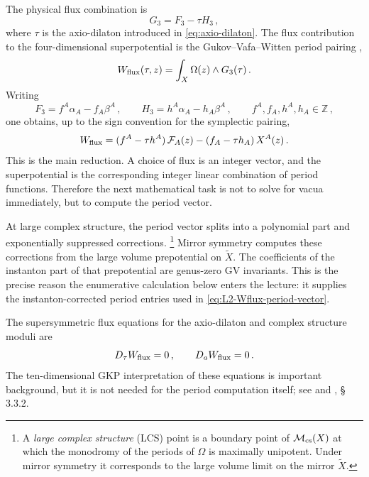 The physical flux combination is
\begin{equation}
    G_3
    =
    F_3-\tau H_3\, ,
\end{equation}
where $\tau$ is the axio-dilaton introduced in
\eqref{eq:axio-dilaton}.  The flux contribution to the
four-dimensional superpotential is the Gukov--Vafa--Witten period
pairing \cite{Gukov:1999ya},
\begin{equation}\label{eq:W-flux}
    W_{\rm flux}(\tau,z)
    =
    \int_X\Omega(z)\wedge G_3(\tau)\, .
\end{equation}
Writing
\begin{equation}
    F_3=f^A\alpha_A-f_A\beta^A\, ,
    \qquad
    H_3=h^A\alpha_A-h_A\beta^A\, ,
    \qquad
    f^A,f_A,h^A,h_A\in\mathbb Z\, ,
\end{equation}
one obtains, up to the sign convention for the symplectic pairing,
\begin{equation}\label{eq:L2-Wflux-period-vector}
    W_{\rm flux}
    =
    (f^A-\tau h^A)\,\mathcal F_A(z)
    -(f_A-\tau h_A)\,X^A(z)\, .
\end{equation}
This is the main reduction.  A choice of flux is an integer vector,
and the superpotential is the corresponding integer linear combination
of period functions.  Therefore the next mathematical task is not to
solve for vacua immediately, but to compute the period vector.

At large complex structure, the period vector splits into a polynomial
part and exponentially suppressed corrections.
\footnote{A \emph{large complex structure} (LCS) point is a boundary
point of $\mathcal M_{\rm cs}(X)$ at which the monodromy of the
periods of $\Omega$ is maximally unipotent.  Under mirror symmetry it
corresponds to the large volume limit on the mirror $\widetilde X$.}
Mirror symmetry computes these corrections from the large volume
prepotential on $\widetilde X$.  The coefficients of the instanton
part of that prepotential are genus-zero GV invariants.  This is the
precise reason the enumerative calculation below enters the lecture:
it supplies the instanton-corrected period entries used in
\eqref{eq:L2-Wflux-period-vector}.

The supersymmetric flux equations for the axio-dilaton and complex
structure moduli are
\begin{equation}\label{eq:L2-flux-Fterms}
    D_\tau W_{\rm flux}=0\, ,
    \qquad
    D_a W_{\rm flux}=0\, .
\end{equation}
The ten-dimensional GKP interpretation of these equations is important
background, but it is not needed for the period computation itself; see
\cite{Giddings:2001yu} and \cite{McAllister:2025qwq}, \S\,3.3.2.


